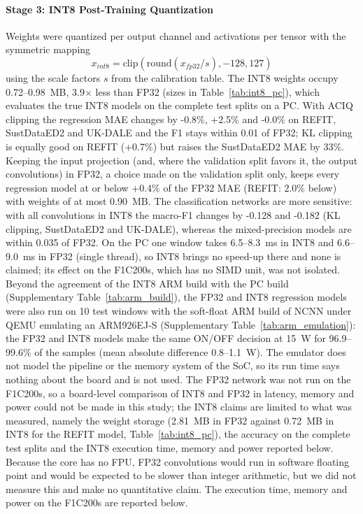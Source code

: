 \documentclass[fleqn,10pt]{wlscirep}
\begin{document}
\paragraph{Stage 3: INT8 Post-Training Quantization}
Weights were quantized per output channel and activations per tensor with the symmetric mapping
\begin{equation}
x_{int8} = \text{clip}(\text{round}(x_{fp32} / s), -128, 127)
\end{equation}
using the scale factors $s$ from the calibration table. The INT8 weights occupy 0.72--0.98~MB, 3.9$\times$ less than FP32 (sizes in Table~\ref{tab:int8_pc}), which evaluates the true INT8 models on the complete test splits on a PC. With ACIQ clipping the regression MAE changes by -0.8\%, +2.5\% and -0.0\% on REFIT, SustDataED2 and UK-DALE and the F1 stays within 0.01 of FP32; KL clipping is equally good on REFIT (+0.7\%) but raises the SustDataED2 MAE by 33\%. Keeping the input projection (and, where the validation split favors it, the output convolutions) in FP32, a choice made on the validation split only, keeps every regression model at or below +0.4\% of the FP32 MAE (REFIT: 2.0\% below) with weights of at most 0.90~MB. The classification networks are more sensitive: with all convolutions in INT8 the macro-F1 changes by -0.128 and -0.182 (KL clipping, SustDataED2 and UK-DALE), whereas the mixed-precision models are within 0.035 of FP32. On the PC one window takes 6.5--8.3~ms in INT8 and 6.6--9.0~ms in FP32 (single thread), so INT8 brings no speed-up there and none is claimed; its effect on the F1C200s, which has no SIMD unit, was not isolated. Beyond the agreement of the INT8 ARM build with the PC build (Supplementary Table~\ref{tab:arm_build}), the FP32 and INT8 regression models were also run on 10 test windows with the soft-float ARM build of NCNN under QEMU emulating an ARM926EJ-S (Supplementary Table~\ref{tab:arm_emulation}): the FP32 and INT8 models make the same ON/OFF decision at 15~W for 96.9--99.6\% of the samples (mean absolute difference 0.8--1.1~W). The emulator does not model the pipeline or the memory system of the SoC, so its run time says nothing about the board and is not used. The FP32 network was not run on the F1C200s, so a board-level comparison of INT8 and FP32 in latency, memory and power could not be made in this study; the INT8 claims are limited to what was measured, namely the weight storage (2.81~MB in FP32 against 0.72~MB in INT8 for the REFIT model, Table~\ref{tab:int8_pc}), the accuracy on the complete test splits and the INT8 execution time, memory and power reported below. Because the core has no FPU, FP32 convolutions would run in software floating point and would be expected to be slower than integer arithmetic, but we did not measure this and make no quantitative claim. The execution time, memory and power on the F1C200s are reported below.
\end{document}
